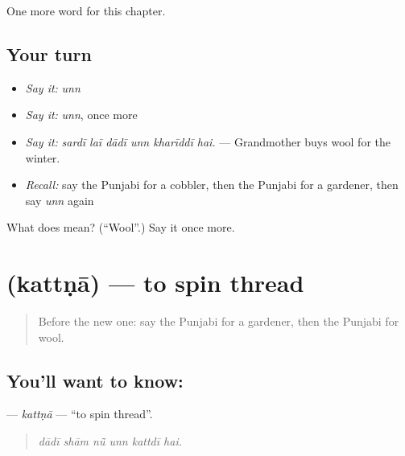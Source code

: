 \begin{grammarlens}[title={What you've built}]
One more word for this chapter.
\end{grammarlens}

\subsection*{Your turn}
\begin{itemize}
\raggedright
  \item \emph{Say it:} \emph{unn}
  \item \emph{Say it:} \emph{unn}, once more
  \item \emph{Say it:} \emph{sardī laī dādī unn kharīddī hai.} — Grandmother buys wool for the winter.
  \item \emph{Recall:} say the Punjabi for a cobbler, then the Punjabi for a gardener, then say \emph{unn} again
\end{itemize}

\begin{tcolorbox}[breakable,colback=teal!4,colframe=teal!35!black,title={Before you move on}]
What does  mean? (\textquotedblleft{}Wool\textquotedblright{}.) Say it once more.
\end{tcolorbox}
\section[\texorpdfstring{\pa{ਕੱਤਣਾ} (kattṇā)}{ਕੱਤਣਾ (kattṇā)}]{ (kattṇā) — to spin thread}

\label{lesson:PA-C334-kattna-spin}



\begin{quote}
Before the new one: say the Punjabi for a gardener, then the Punjabi for wool.
\end{quote}

\subsection*{You'll want to know: }
\textbf{} — \emph{kattṇā} — \textquotedblleft{}to spin thread\textquotedblright{}.

\begin{quote}
     
\end{quote}

\begin{quote}
\emph{dādī shām nū̃ unn kattdī hai.}
\end{quote}

